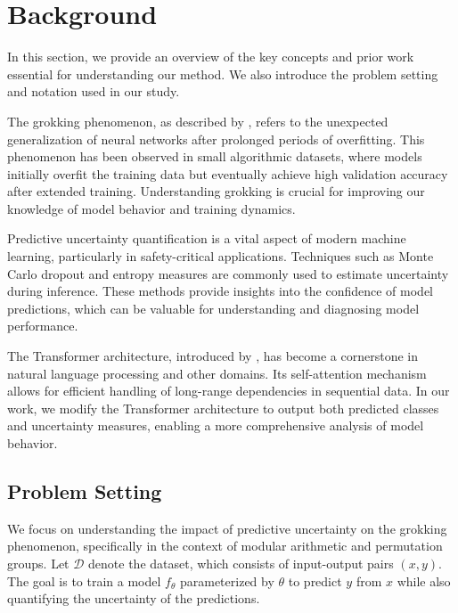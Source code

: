 \documentclass{article} %
\begin{document}
\section{Background}
\label{sec:background}

In this section, we provide an overview of the key concepts and prior work essential for understanding our method. We also introduce the problem setting and notation used in our study.

The grokking phenomenon, as described by \citet{power2022grokking}, refers to the unexpected generalization of neural networks after prolonged periods of overfitting. This phenomenon has been observed in small algorithmic datasets, where models initially overfit the training data but eventually achieve high validation accuracy after extended training. Understanding grokking is crucial for improving our knowledge of model behavior and training dynamics.

Predictive uncertainty quantification is a vital aspect of modern machine learning, particularly in safety-critical applications. Techniques such as Monte Carlo dropout and entropy measures are commonly used to estimate uncertainty during inference. These methods provide insights into the confidence of model predictions, which can be valuable for understanding and diagnosing model performance.

The Transformer architecture, introduced by \citet{vaswani2017attention}, has become a cornerstone in natural language processing and other domains. Its self-attention mechanism allows for efficient handling of long-range dependencies in sequential data. In our work, we modify the Transformer architecture to output both predicted classes and uncertainty measures, enabling a more comprehensive analysis of model behavior.

\subsection{Problem Setting}
\label{sec:problem_setting}
We focus on understanding the impact of predictive uncertainty on the grokking phenomenon, specifically in the context of modular arithmetic and permutation groups. Let \( \mathcal{D} \) denote the dataset, which consists of input-output pairs \( (x, y) \). The goal is to train a model \( f_\theta \) parameterized by \( \theta \) to predict \( y \) from \( x \) while also quantifying the uncertainty of the predictions.
\end{document}
